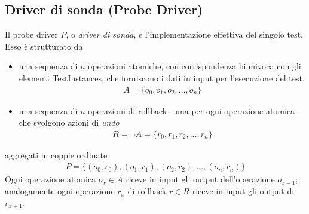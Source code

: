 \documentclass[../main.tex]{subfiles}
\begin{document}
\subsection {Driver di sonda (Probe Driver)}
Il probe driver $P$, o \textit{driver di sonda}, è l'implementazione effettiva del singolo test.
Esso è strutturato da
\begin{itemize}
\item una sequenza di $n$ operazioni atomiche, con corrispondenza biunivoca con gli elementi TestInstances, che forniscono i dati in input per l'esecuzione del test.
\begin{align*}
A = \{ o_0, o_1, o_2, ... , o_n \}
\end{align*}
\item una sequenza di $n$ operazioni di rollback - una per ogni operazione atomica - che svolgono azioni di \textit{undo}
\begin{align*}
R = \lnot A = \{ r_0, r_1, r_2, ... , r_n \}
\end{align*}
\end{itemize}
aggregati in coppie ordinate
\begin{align*}
P = \{ (o_0, r_0), (o_1, r_1) , (o_2, r_2) , ... , (o_n, r_n)\}
\end{align*}
Ogni operazione atomica $o_x \in A$ riceve in input gli output dell'operazione $o_{x-1}$; analogamente ogni operazione $r_x$ di rollback $r \in R$ riceve in input gli output di $r_{x+1}$.
\end{document}
